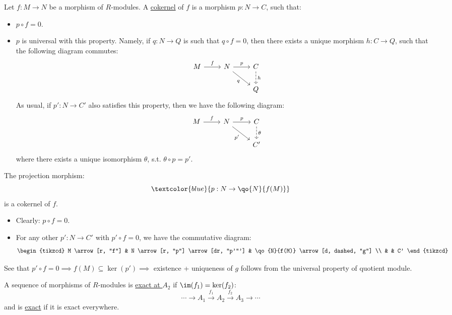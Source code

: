 \begin{definition}
	Let \( f: M\to N \) be a morphism of \( R \)-modules. A \underline{cokernel} of \( f \) is a morphism \( p: N \to C \), such that:
	\begin{itemize}
		\item \( p\circ f = 0 \).
		\item \( p \) is universal with this property. Namely, if \( q: N \to Q \) is such that \( q\circ f = 0 \), then there exists a unique morphism \( h: C \to Q \), such that the following diagram commutes:
		      \[
			      \begin{tikzcd}
				      M \arrow[r, "f"] & N \arrow[r, "p"] \arrow[dr, "q"'] & C \arrow[d, dashed, "h"] \\
				      & & Q
			      \end{tikzcd}
		      \]
		      As usual, if \( p': N \to C' \) also satisfies this property, then we have the following diagram:
		      \[
			      \begin{tikzcd}
				      M \arrow[r, "f"] & N \arrow[r, "p"] \arrow[dr, "p'"'] & C \arrow[d, dashed, "\theta"] \\
				      & & C'
			      \end{tikzcd}
		      \]
		      where there exists a unique isomorphism \( \theta \), s.t. \( \theta \circ p = p' \).
	\end{itemize}
\end{definition}

\begin{claim}
	The projection morphism:
	\[
		\textcolor{blue}{p : N \rightarrow \qo{N}{f(M)}}
	\]
	is a cokernel of \( f \).
	\begin{itemize}
		\item Clearly: \( p\circ f = 0 \).
		\item For any other \( p': N \to C' \) with \( p' \circ f = 0 \), we have the commutative diagram:
		      \[
			      \begin{tikzcd}
				      M \arrow[r, "f"] & N \arrow[r, "p"] \arrow[dr, "p'"'] & \qo{N}{f(M)} \arrow[d, dashed, "g"] \\
				      & & C'
			      \end{tikzcd}
		      \]
	\end{itemize}
	See that \( p'\circ f = 0 \implies f(M) \subseteq \ker(p') \implies \) existence + uniqueness of
	\( g \) follows from the universal property of quotient module.
\end{claim}

\begin{definition}
	A sequence of morphisms of \( R \)-modules is \underline{exact at \( A_2 \)} if \( \im(f_1) =
	\ker(f_2) \):
	\[
		\cdots \rightarrow A_1 \xrightarrow{f_1} A_2 \xrightarrow{f_2} A_3 \rightarrow \cdots
	\]
	and is \underline{exact} if it is exact everywhere.
\end{definition}

